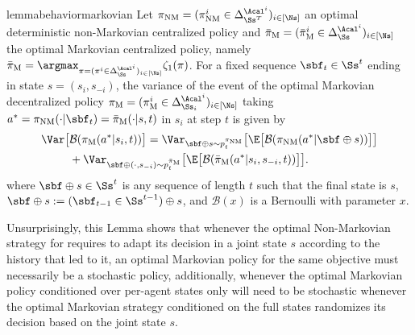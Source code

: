 \begin{restatable}{lemma}{behaviormarkovian}
	Let $\pi_{\text{NM}} = (\pi^i_{\text{NM}}\in\Delta_{\Ss^T}^{\Acal^i})_{i \in [\Ns]}$ an optimal deterministic non-Markovian centralized policy and $\bar \pi_{\text{M}} = (\bar \pi^i_{\text{M}}\in\Delta_{\Ss}^{\Acal^i})_{i \in [\Ns]}$ the optimal Markovian centralized policy, namely $\bar \pi_{\text{M}}  = \argmax_{\pi = (\pi^i\in\Delta_{\Ss}^{\Acal^i})_{i \in [\Ns]} }\zeta_1(\pi)$. For a fixed sequence $\sbf_t \in \Ss^t$ ending in state $s = (s_i,s_{-i})$, the variance of the event of the optimal Markovian decentralized policy $ \pi_{\text{M}} = ( \pi^i_{\text{M}}\in\Delta_{\Ss_i}^{\Acal^i})_{i \in [\Ns]}$ taking $a^* = \pi_{\text{NM}} (\cdot|\sbf_t) = \bar \pi_{\text{M}}(\cdot|s,t)$ in $s_i$ at step $t$ is given by
	\begin{align*}
		\Var \big[ &\mathcal{B} ( \pi_{\text{M}} (a^*|s_i, t) ) \big] = \Var_{\sbf  \oplus s \sim p^{\pi_{\text{NM}}}_t} \big[ \E \big[ \mathcal{B} ( \pi_{\text{NM}} (a^* | \sbf  \oplus s) ) \big] \big]\\ &+ \Var_{\sbf \oplus(\cdot, s_{-i}) \sim p^{\bar \pi_{\text{M}}}_t} \big[ \E \big[ \mathcal{B} ( \bar \pi_{\text{M}} (a^* |  s_i, s_{-i}, t) ) \big] \big].
	\end{align*}
	where $\sbf \oplus s \in \Ss^t$ is any sequence of length $t$ such that the final state is $s$, \ie $\sbf \oplus s := (\sbf_{t - 1} \in \Ss^{t - 1}) \oplus s$, and $\mathcal{B} (x)$ is a Bernoulli with parameter $x$.
    \label{thr:behaviormarkovian}
\end{restatable}

Unsurprisingly, this Lemma shows that whenever the optimal Non-Markovian strategy for requires to adapt its decision in a joint state $s$ according to the history that led to it, an optimal Markovian policy for the same objective  must necessarily be a stochastic policy, additionally, whenever the optimal Markovian policy conditioned over per-agent states only will need to be stochastic whenever the optimal Markovian strategy conditioned on the full states randomizes its decision based on the joint state $s$.

